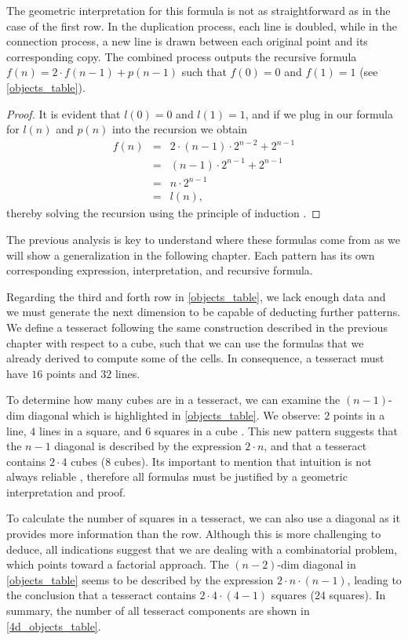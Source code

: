 \documentclass{article}
\begin{document}
	The geometric interpretation for this formula is not as straightforward as in the case of the first row. In the duplication process, each line is doubled, while in the connection process, a new line is drawn between each original point and its corresponding copy. The combined process outputs the recursive formula $f(n) = 2 \cdot f(n-1) + p(n-1)$ such that $f(0) = 0$ and $f(1) = 1$ (see \autoref{objects_table}).
	
	\begin{proof}
		It is evident that $l(0) = 0$ and $l(1) = 1$, and if we plug in our formula for $l(n)$ and $p(n)$ into the recursion we obtain
		\begin{eqnarray*}
			f(n) & = & 2 \cdot (n-1) \cdot 2^{n-2} + 2^{n-1}\\
			& = & (n-1) \cdot 2^{n-1} + 2^{n-1}\\
			& = & n \cdot 2^{n-1}\\
			& = & l(n),
		\end{eqnarray*}
		thereby solving the recursion using the principle of induction \cite{rosen2011discrete}.
	\end{proof}
	
	The previous analysis is key to understand where these formulas come from as we will show a generalization in the following chapter. Each pattern has its own corresponding expression, interpretation, and recursive formula.
	
	Regarding the third and forth row in \autoref{objects_table}, we lack enough data and we must generate the next dimension to be capable of deducting further patterns. We define a tesseract following the same construction described in the previous chapter with respect to a cube, such that we can use the formulas that we already derived to compute some of the cells. In consequence, a tesseract must have $16$ points and $32$ lines.
	
	To determine how many cubes are in a tesseract, we can examine the $(n-1)$-dim diagonal which is highlighted in \autoref{objects_table}. We observe: $2$ points in a line, $4$ lines in a square, and $6$ squares in a cube \cite{coxeter1973regular}. This new pattern suggests that the $n-1$ diagonal is described by the expression $2 \cdot n$, and that a tesseract contains $2 \cdot 4$ cubes ($8$ cubes). Its important to mention that intuition is not always reliable \cite{coxeter1973regular}, therefore all formulas must be justified by a geometric interpretation and proof.
	
	To calculate the number of squares in a tesseract, we can also use a diagonal as it provides more information than the row. Although this is more challenging to deduce, all indications suggest that we are dealing with a combinatorial problem, which points toward a factorial approach. The $(n-2)$-dim diagonal in \autoref{objects_table} seems to be described by the expression $2 \cdot n \cdot (n-1)$, leading to the conclusion that a tesseract contains $2 \cdot 4 \cdot (4-1)$ squares ($24$ squares). In summary, the number of all tesseract components are shown in \autoref{4d_objects_table}.
	
\end{document}
